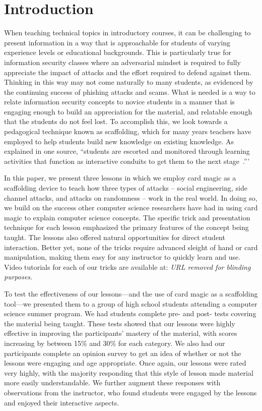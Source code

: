 \section{Introduction}
\label{SEC:introduction}

When teaching technical topics
in introductory courses,
it can be challenging
to present information
in a way that is approachable
for students of varying
experience levels
or educational backgrounds.
This is particularly true
for information security classes
where an adversarial mindset
is required
to fully appreciate the impact of attacks and the effort required to
defend against them.
Thinking in this way
may not come naturally
to many students,
as evidenced
by the continuing success of phishing attacks
and scams.
What is needed
is a way
to relate information security concepts
to novice students
in a manner
that is engaging enough
to build an appreciation for the material,
and relatable enough that the students do not feel lost.
To accomplish this, we look towards a pedagogical technique known as scaffolding, which for many years teachers have employed to help students build
new knowledge on existing knowledge.
As explained in one source,
``students are escorted and monitored through learning
activities that function as interactive conduits to get
them to the next stage~\cite{raymond2000}.'''

In this paper, 
we present three lessons in which we employ card magic as a scaffolding device to teach how three types
of attacks -- social engineering, side channel attacks, and attacks on
randomness -- work in the real world. In doing so, we build on the
success other computer science researchers have had 
in using card magic
to explain computer science concepts. The specific trick and presentation technique
for each lesson emphasized the primary
features of the concept being taught.
The lessons also offered natural opportunities
for direct student interaction.
Better yet, none of the tricks require advanced sleight of hand
or card manipulation,
making them easy for any instructor to quickly learn and use.
Video tutorials for each of our tricks are available at: \textit{URL removed
for blinding purposes}.

To test the effectiveness of our lessons—and the use of card magic as a scaffolding tool—we presented them to
a group of high school students
attending a computer science summer program.
We had students complete pre- and post- tests covering the
material being taught.  These tests showed that our lessons were highly
effective in improving the participants' mastery of the material,
with scores
increasing by between 15\% and 30\% for each category.
We also had our participants complete an opinion survey to get an idea of
whether or not the lessons were engaging and age appropriate.  Once again, our
lessons were rated very highly,
with the majority responding that this style of lesson made material
more easily understandable.
We further augment these responses
with observations
from the instructor,
who found students were engaged by the lessons and enjoyed their interactive
aspects.


